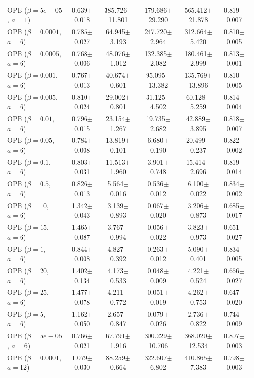 \begin{table}[t]
{\begin{tabular}{l c c c c c}
OPB ($\beta=5e-05$, $a=1$) & 0.639$\pm$0.018 & 385.726$\pm$11.801 & 179.686$\pm$29.290 & 565.412$\pm$21.878 & 0.819$\pm$0.007 \\
OPB ($\beta=0.0001$, $a=6$) & 0.785$\pm$0.027 & 64.945$\pm$3.193 & 247.720$\pm$2.964 & 312.664$\pm$5.420 & 0.810$\pm$0.005 \\
OPB ($\beta=0.0005$, $a=6$) & 0.768$\pm$0.006 & 48.076$\pm$1.012 & 132.385$\pm$2.082 & 180.461$\pm$2.999 & 0.813$\pm$0.001 \\
OPB ($\beta=0.001$, $a=6$) & 0.767$\pm$0.013 & 40.674$\pm$0.601 & 95.095$\pm$13.382 & 135.769$\pm$13.896 & 0.810$\pm$0.005 \\
OPB ($\beta=0.005$, $a=6$) & 0.810$\pm$0.024 & 29.002$\pm$0.801 & 31.125$\pm$4.502 & 60.128$\pm$5.259 & 0.814$\pm$0.004 \\
OPB ($\beta=0.01$, $a=6$) & 0.796$\pm$0.015 & 23.154$\pm$1.267 & 19.735$\pm$2.682 & 42.889$\pm$3.895 & 0.818$\pm$0.007 \\
OPB ($\beta=0.05$, $a=6$) & 0.784$\pm$0.008 & 13.819$\pm$0.101 & 6.680$\pm$0.190 & 20.499$\pm$0.237 & 0.822$\pm$0.002 \\
OPB ($\beta=0.1$, $a=6$) & 0.803$\pm$0.031 & 11.513$\pm$1.960 & 3.901$\pm$0.748 & 15.414$\pm$2.696 & 0.819$\pm$0.014 \\
OPB ($\beta=0.5$, $a=6$) & 0.826$\pm$0.013 & 5.564$\pm$0.016 & 0.536$\pm$0.012 & 6.100$\pm$0.022 & 0.834$\pm$0.002 \\
OPB ($\beta=10$, $a=6$) & 1.342$\pm$0.043 & 3.139$\pm$0.893 & 0.067$\pm$0.020 & 3.206$\pm$0.873 & 0.685$\pm$0.017 \\
OPB ($\beta=15$, $a=6$) & 1.465$\pm$0.087 & 3.767$\pm$0.994 & 0.056$\pm$0.022 & 3.823$\pm$0.973 & 0.651$\pm$0.027 \\
OPB ($\beta=1$, $a=6$) & 0.844$\pm$0.008 & 4.827$\pm$0.392 & 0.263$\pm$0.012 & 5.090$\pm$0.401 & 0.834$\pm$0.005 \\
OPB ($\beta=20$, $a=6$) & 1.402$\pm$0.134 & 4.173$\pm$0.533 & 0.048$\pm$0.009 & 4.221$\pm$0.524 & 0.666$\pm$0.027 \\
OPB ($\beta=25$, $a=6$) & 1.477$\pm$0.078 & 4.211$\pm$0.772 & 0.051$\pm$0.019 & 4.262$\pm$0.753 & 0.647$\pm$0.020 \\
OPB ($\beta=5$, $a=6$) & 1.162$\pm$0.050 & 2.657$\pm$0.847 & 0.079$\pm$0.026 & 2.736$\pm$0.822 & 0.744$\pm$0.009 \\
OPB ($\beta=5e-05$, $a=6$) & 0.766$\pm$0.021 & 67.791$\pm$1.916 & 300.229$\pm$10.706 & 368.020$\pm$12.534 & 0.807$\pm$0.003 \\
OPB ($\beta=0.0001$, $a=12$) & 1.079$\pm$0.030 & 88.259$\pm$0.664 & 322.607$\pm$6.802 & 410.865$\pm$7.383 & 0.798$\pm$0.003 \\

\end{tabular}}
\end{table}
